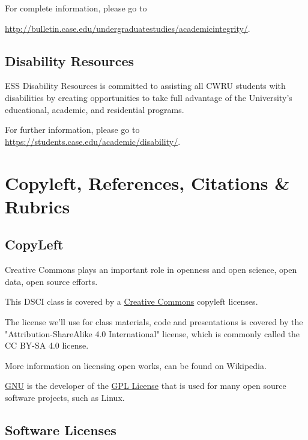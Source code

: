 \documentclass[10pt]{article} %
\begin{document}
    For complete information, please go to

     \href{"http://bulletin.case.edu/undergraduatestudies/academicintegrity/"}{http://bulletin.case.edu/undergraduatestudies/academicintegrity/}.

  \subsection{Disability Resources}

    ESS Disability Resources is committed to assisting all CWRU students with disabilities by creating opportunities to take full advantage of the University's educational, academic, and residential programs.

    For further information, please go to \href{"https://students.case.edu/academic/disability/''}{https://students.case.edu/academic/disability/}.

\section{Copyleft, References, Citations  \& Rubrics}


  \subsection{CopyLeft}

    Creative Commons plays an important role in openness and open science, open data, open source efforts.

    This DSCI class \cite{french_dsci351-4511:_2015} is covered by a \href{"http://creativecommons.org/licenses/"}{Creative Commons}  \cite{commons_creative_2014} copyleft licenses.

    The license we'll use for class materials, code and presentations is covered by  the "Attribution-ShareAlike 4.0 International" license, which is commonly called the CC BY-SA 4.0 license. \cite{_creative_2015}

    More information on licensing open works, can be found on Wikipedia. \cite{commons_creative_2014-1}

    \href{"http://www.gnu.org/copyleft/gpl.html"}{GNU} \cite{gnu_gnu.org_2014} is the developer of the \href{"http://en.wikipedia.org/wiki/GNU_General_Public_License"}{GPL License} \cite{gpl_gnu_2014}  that is used for many open source software projects, such as Linux.

  \subsection{Software Licenses}
\end{document}
